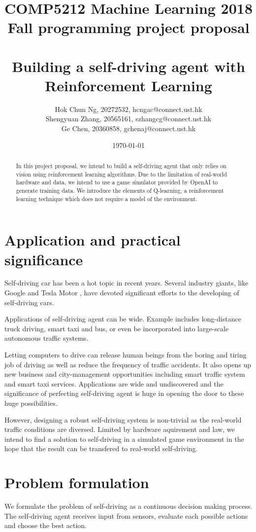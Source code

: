 \documentclass[a4paper]{article}
\title{COMP5212 Machine Learning 2018 Fall programming project proposal \\
       \ \ \ \ \\
       Building a self-driving agent with Reinforcement Learning}
\author{Hok Chun Ng, 20272532, hcngac@connect.ust.hk \\
        Shengyuan Zhang, 20565161, szhangcg@connect.ust.hk \\
        Ge Chen, 20360858, gchenaj@connect.ust.hk}
\date{\today}
\begin{document}
\maketitle

\begin{abstract}
In this project proposal, we intend to build a self-driving agent that only relies on vision using reinforcement learning algorithms. Due to the limitation of real-world hardware and data, we intend to use a game simulator provided by OpenAI \cite{gym} to generate training data. We introduce the elements of Q-learning, a reinforcement learning technique which does not require a model of the environment.
\end{abstract}

\section{Application and practical significance}

Self-driving car has been a hot topic in recent years. Several industry giants, like Google \cite{google} and Tesla Motor \cite{tesla}, have devoted significant efforts to the developing of self-driving cars. 

Applications of self-driving agent can be wide. Example includes long-distance truck driving, smart taxi and bus, or even be incorporated into large-scale autonomous traffic systems.

Letting computers to drive can release human beings from the boring and tiring job of driving as well as reduce the frequency of traffic accidents. It also opens up new business and city-management opportunities including smart traffic system and smart taxi services. Applications are wide and undiscovered and the significance of perfecting self-driving agent is huge in opening the door to these huge possibilities.

However, designing a robust self-driving system is non-trivial as the real-world traffic conditions are diversed. Limited by hardware aquirement and law, we intend to find a solution to self-driving in a simulated game environment in the hope that the result can be transfered to real-world self-driving.


\section{Problem formulation}

We formulate the problem of self-driving as a continuous decision making process. The self-driving agent receives input from sensors, evaluate each possible actions and choose the best action.
\end{document}
